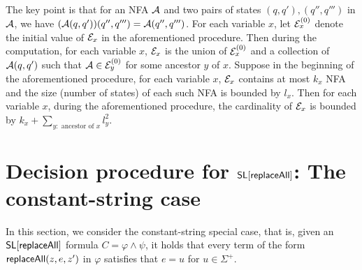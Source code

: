 The key point is that for an NFA $\mathcal{A}$ and two pairs of states $(q,q'), (q'', q''')$ in $\mathcal{A}$, we have $(\mathcal{A}(q,q'))(q'', q''')= \mathcal{A}(q'', q''')$. For each variable $x$, let $\mathcal{E}^{(0)}_x$ denote the initial value of $\mathcal{E}_x$ in the aforementioned procedure. Then during the computation, for each variable $x$, $\mathcal{E}_x$ is the union of $\mathcal{E}^{(0)}_x$ and a collection of $\mathcal{A}(q,q')$ such that $\mathcal{A} \in \mathcal{E}^{(0)}_y$ for some ancestor $y$ of $x$. Suppose in the beginning of the aforementioned procedure, for each variable $x$, $\mathcal{E}_x$ contains at most $k_x$ NFA and the size (number of states) of each such NFA is bounded by $l_x$. Then for each variable $x$, during the aforementioned procedure, the cardinality of $\mathcal{E}_x$ is bounded by $k_x + \sum \limits_{y: \mbox{ ancestor of }x} l^2_y$.





\begin{example}
\end{example}



\section{Decision procedure for $\mathsf{SL}[\mathsf{replaceAll}]$: The constant-string case}

In this section, we consider the constant-string special case, that is, given an $\mathsf{SL}[\mathsf{replaceAll}]$ formula $C = \varphi \wedge \psi$, it holds that every term of the form $\mathsf{replaceAll}(z, e, z')$ in $\varphi$ satisfies that $e=u$ for $u \in \Sigma^+$.

